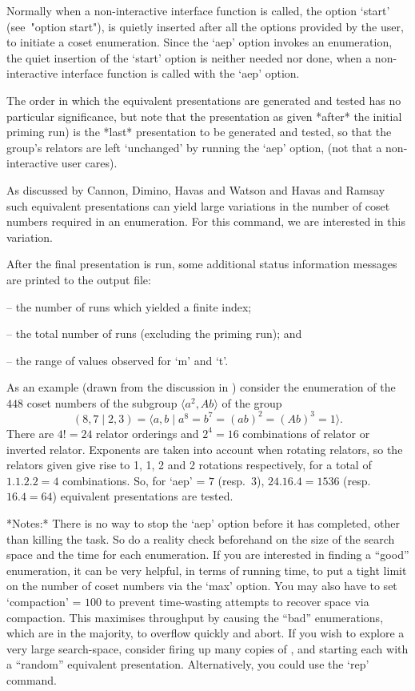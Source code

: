 Normally when a non-interactive {\ACE} interface function  is  called,
the option `start' (see~"option start"), is quietly inserted after all
the options provided by the user, to  initiate  a  coset  enumeration.
Since the `aep' option invokes an enumeration, the quiet insertion  of
the `start' option is neither needed nor done, when a  non-interactive
{\ACE} interface function is called with the `aep' option.

The order in which the  equivalent  presentations  are  generated  and
tested has no particular significance, but note that the  presentation
as given *after* the initial priming run) is the  *last*  presentation
to be generated and tested, so that  the  group's  relators  are  left
`unchanged' by running the `aep' option, (not that  a  non-interactive
user cares).

As discussed by Cannon, Dimino, Havas  and  Watson  \cite{CDHW73}  and
Havas and Ramsay \cite{HR99b} such equivalent presentations can  yield
large variations in  the  number  of  coset  numbers  required  in  an
enumeration. For this command, we are interested in this variation.

After  the  final  presentation  is  run,   some   additional   status
information messages are printed to the {\ACE} output file:

\beginlist
\item{--}  the number of runs which yielded a finite index; 
\item{--}  the total number of runs (excluding the priming run); and 
\item{--}  the range of values observed for `m' and `t'.
\endlist

As an example (drawn from the discussion in \cite{HR99a}) consider the
enumeration   of   the   $448$   coset   numbers   of   the   subgroup
$\langle  a^2,Ab \rangle$ of the group
$$
(8,7 \mid 2,3) 
    = \langle a,b \mid a^8 = b^7 = (ab)^2 = (Ab)^3 = 1 \rangle.
$$
There are $4!=24$  relator  orderings  and  $2^4=16$  combinations  of
relator or inverted relator. Exponents are  taken  into  account  when
rotating relators, so the relators given give rise to 1, 1,  2  and  2
rotations respectively, for a total of $1.1.2.2=4$  combinations.  So,
for  `aep'  =  $7$   (resp.~$3$),   $24.16.4=1536$   (resp.~$16.4=64$)
equivalent presentations are tested.

*Notes:*
There is no way to stop the `aep'  option  before  it  has  completed,
other than killing the task. So do a reality check beforehand  on  the
size of the search space and the time for each enumeration. If you are
interested in finding a ``good'' enumeration, it can be very  helpful,
in terms of running time, to put a tight limit on the number of  coset
numbers via the `max' option. You may also have to set `compaction'  =
$100$  to  prevent  time-wasting  attempts  to   recover   space   via
compaction.  This  maximises  throughput  by   causing   the   ``bad''
enumerations, which are in  the  majority,  to  overflow  quickly  and
abort. If you wish to explore  a  very  large  search-space,  consider
firing up many copies of {\ACE}, and starting each with  a  ``random''
equivalent  presentation.  Alternatively,  you  could  use  the  `rep'
command.

